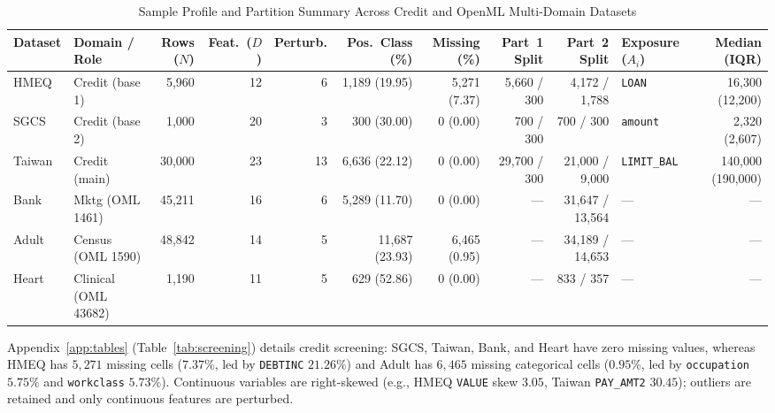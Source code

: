 \documentclass[conference]{IEEEtran}
\begin{document}
\begin{table}[!t]
\centering
\caption{Sample Profile and Partition Summary Across Credit and OpenML Multi-Domain Datasets}
\label{tab:sample_profile}
\scriptsize
\renewcommand{\arraystretch}{0.80}
\setlength{\tabcolsep}{2.4pt}
\begin{tabular}{@{}llrrrrrrrlr@{}}
\toprule
\textbf{Dataset} & \textbf{Domain / Role} & \textbf{Rows ($N$)} & \textbf{Feat.\ ($D$)} & \textbf{Perturb.} & \textbf{Pos.\ Class (\%)} & \textbf{Missing (\%)} & \textbf{Part~1 Split} & \textbf{Part~2 Split} & \textbf{Exposure ($A_i$)} & \textbf{Median (IQR)} \\
\midrule
HMEQ~\cite{baesens2016} & Credit (base 1) & 5,960 & 12 & 6 & 1,189 (19.95) & 5,271 (7.37) & 5,660 / 300 & 4,172 / 1,788 & \texttt{LOAN} & 16,300 (12,200) \\
SGCS~\cite{sgcs2019} & Credit (base 2) & 1,000 & 20 & 3 & 300 (30.00) & 0 (0.00) & 700 / 300 & 700 / 300 & \texttt{amount} & 2,320 (2,607) \\
Taiwan~\cite{yeh2009} & Credit (main) & 30,000 & 23 & 13 & 6,636 (22.12) & 0 (0.00) & 29,700 / 300 & 21,000 / 9,000 & \texttt{LIMIT\_BAL} & 140,000 (190,000) \\
\midrule
Bank~\cite{vanschoren2014} & Mktg (OML 1461) & 45,211 & 16 & 6 & 5,289 (11.70) & 0 (0.00) & --- & 31,647 / 13,564 & --- & --- \\
Adult~\cite{vanschoren2014} & Census (OML 1590) & 48,842 & 14 & 5 & 11,687 (23.93) & 6,465 (0.95) & --- & 34,189 / 14,653 & --- & --- \\
Heart~\cite{vanschoren2014} & Clinical (OML 43682) & 1,190 & 11 & 5 & 629 (52.86) & 0 (0.00) & --- & 833 / 357 & --- & --- \\
\bottomrule
\end{tabular}
\end{table}

Appendix~\ref{app:tables} (Table~\ref{tab:screening}) details credit screening: SGCS, Taiwan, Bank, and Heart have zero missing values, whereas HMEQ has $5{,}271$ missing cells ($7.37\%$, led by \texttt{DEBTINC} $21.26\%$) and Adult has $6{,}465$ missing categorical cells ($0.95\%$, led by \texttt{occupation} $5.75\%$ and \texttt{workclass} $5.73\%$). Continuous variables are right-skewed (e.g., HMEQ \texttt{VALUE} skew $3.05$, Taiwan \texttt{PAY\_AMT2} $30.45$); outliers are retained and only continuous features are perturbed.
\end{document}
